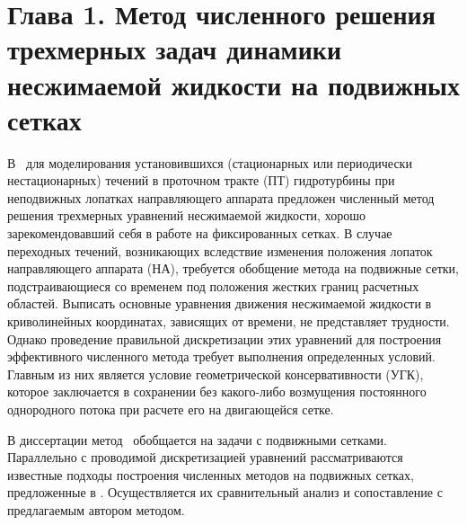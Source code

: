 ﻿%
\chapter*{Глава 1. Метод численного решения трехмерных задач динамики несжимаемой жидкости 
на подвижных сетках}
\label{s:1}
\setcounter{chapter}{1}
\setcounter{section}{0}

В~\cite{Cher} для моделирования установившихся (стационарных или периодически нестационарных) течений в 
проточном тракте (ПТ) гидротурбины при неподвижных лопатках направляющего аппарата предложен 
численный метод решения трехмерных уравнений несжимаемой жидкости, хорошо зарекомендовавший себя в работе на 
фиксированных сетках. В случае переходных течений, возникающих вследствие изменения положения
лопаток направляющего аппарата (НА), требуется обобщение метода на подвижные сетки, 
подстраивающиеся со временем под положения жестких 
границ расчетных областей. Выписать основные уравнения движения несжимаемой жидкости в криволинейных 
координатах, зависящих от времени, не представляет трудности. Однако проведение правильной
дискретизации этих уравнений для построения эффективного численного метода требует выполнения определенных 
условий. Главным из них является условие геометрической консервативности (УГК), которое заключается в 
сохранении без какого-либо возмущения постоянного однородного потока при расчете его на двигающейся сетке.

В диссертации метод~\cite{Cher} обобщается на задачи с подвижными сетками. Параллельно с проводимой
дискретизацией уравнений рассматриваются известные подходы построения численных методов на подвижных сетках, 
предложенные в \cite{trulio,thomas,demper,shyy,lesoin,koobus,forst,engel,zaits,volkov}. Осуществляется их 
сравнительный анализ и сопоставление с предлагаемым автором методом.

